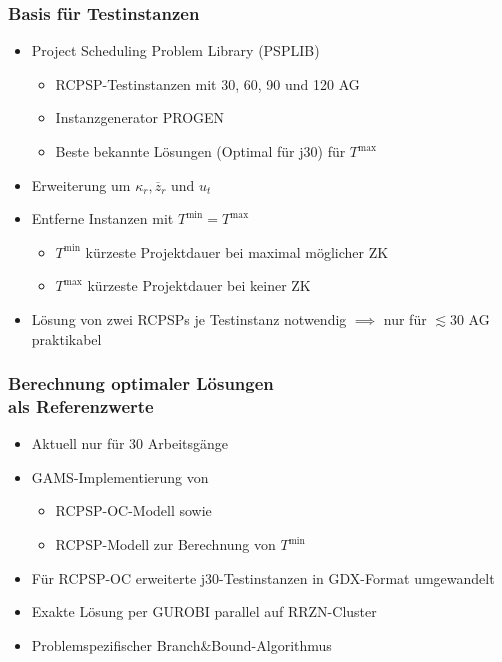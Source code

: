 \begin{frame}[noframenumbering]
\frametitle{Basis für Testinstanzen}
\begin{itemize}
\item Project Scheduling Problem Library (PSPLIB)
	\begin{itemize}
		\item RCPSP-Testinstanzen mit 30, 60, 90 und 120 AG
		\item Instanzgenerator PROGEN
		\item Beste bekannte Lösungen (Optimal für j30) für $T^{\mbox{max}}$\\[4mm]
	\end{itemize}

\item Erweiterung um $\kappa_r, \overline{z}_r$ und $u_t$\\[4mm]

\item Entferne Instanzen mit $T^{\mbox{min}} = T^{\mbox{max}}$
	\begin{itemize}
	\item $T^{\mbox{min}}$ kürzeste Projektdauer bei maximal möglicher ZK
	\item $T^{\mbox{max}}$ kürzeste Projektdauer bei keiner ZK
	\end{itemize}
\item Lösung von zwei RCPSPs je Testinstanz notwendig $\implies$ nur für $\lesssim 30$ AG praktikabel
\end{itemize}

\end{frame}

\begin{frame}[noframenumbering]
\frametitle{Berechnung optimaler Lösungen\\als Referenzwerte}
\begin{itemize}
\item Aktuell nur für 30 Arbeitsgänge\\[4mm]
\item GAMS-Implementierung von
	\begin{itemize}
	\item RCPSP-OC-Modell sowie
	\item RCPSP-Modell zur Berechnung von $T^{\mbox{min}}$\\[4mm]
	\end{itemize}
\item Für RCPSP-OC erweiterte j30-Testinstanzen in GDX-Format umgewandelt
\item Exakte Lösung per GUROBI parallel auf RRZN-Cluster
\item Problemspezifischer Branch\&Bound-Algorithmus
\end{itemize}
\end{frame}

